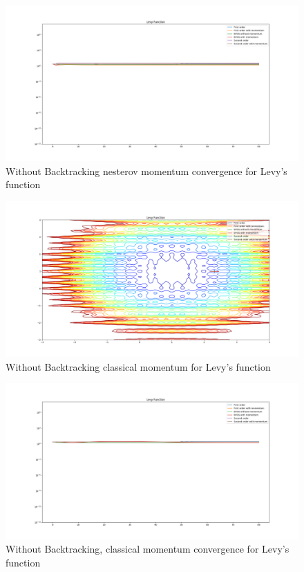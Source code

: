 \documentclass{article}
\begin{document}
\begin{figure}[H]
	\includegraphics[width=\linewidth]{../Images/levynesterov1.png}
	\caption{Without Backtracking nesterov momentum convergence for Levy's function}
	\label{fig:Without Backtracking nesterov momentum convergence for Levy's function}
\end{figure}

\begin{figure}[H]
	\includegraphics[width=\linewidth]{../Images/levymomentum.png}
	\caption{Without Backtracking classical momentum for Levy's function}
	\label{fig:Without Backtracking classical momentum for Levy's function}
\end{figure}

\begin{figure}[H]
	\includegraphics[width=\linewidth]{../Images/levymomentum1.png}
	\caption{Without Backtracking, classical momentum convergence for Levy's function}
	\label{fig:Without Backtracking, classical momentum convergence for Levy's function}
\end{figure}	
\end{document}
